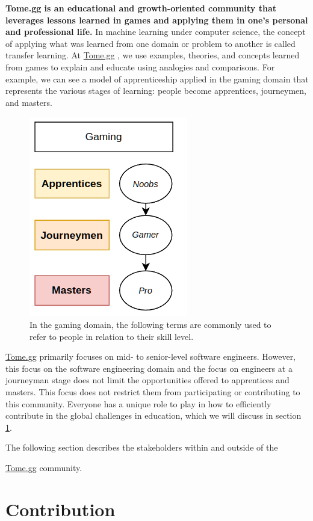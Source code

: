 \documentclass[journal, onecolumn]{IEEEtran}
\newcommand{\tomegg}{
  \href{http://tome.gg}{Tome.gg}
}
\begin{document}
  \textbf{Tome.gg is an educational and growth-oriented community that leverages
  lessons learned in games and applying them in one's personal and professional life.} 
  In machine learning under computer science, the concept of applying what was 
  learned from one domain or problem to another is called transfer learning\cite{b5}.
  At \tomegg, we use examples, theories, and concepts learned from games to explain
  and educate using analogies and comparisons. 
  For example, we can see a model of apprenticeship\cite{b4} applied in the gaming domain
  that represents the various stages of learning: people become apprentices, 
  journeymen, and masters.

\begin{figure}[t]
  \includegraphics[scale=0.7]{stakeholders-gaming}
  \centering
  \caption{In the gaming domain, the following terms are commonly used to refer 
  to people in relation to their skill level.}
  \label{fig:stakeholders-gaming} 
\end{figure}

\tomegg primarily focuses on mid- to senior-level software engineers. However, 
this focus on the software engineering domain and the focus on engineers at a
journeyman stage does not limit the opportunities offered to apprentices and 
masters. This focus does not restrict them from participating or contributing 
to this community. Everyone has a unique role to play in how to efficiently 
contribute in the global challenges in education, which we will discuss in 
section \ref{sec:contribution}.

The following section describes the stakeholders within and outside of the
\tomegg community.

\section{Contribution}
\label{sec:contribution}
\end{document}
